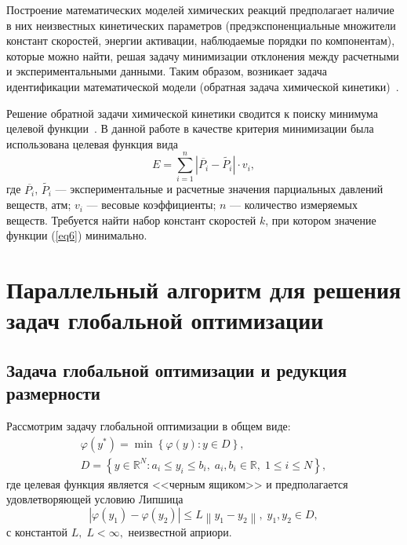 \documentclass{cmi}
\begin{document}
Построение математических моделей химических реакций предполагает наличие в них неизвестных кинетических параметров (предэкспоненциальные множители констант скоростей, энергии активации, наблюдаемые порядки по компонентам), которые можно найти, решая задачу минимизации отклонения между расчетными и экспериментальными данными. Таким образом, возникает задача идентификации математической модели (обратная задача химической кинетики)~.

Решение обратной задачи химической кинетики сводится к поиску минимума целевой функции~. В данной работе в качестве критерия минимизации была использована целевая функция вида
\begin{equation}\label{eq6}
E=\sum_{i=1}^n \left|\overline{P_{i}}-\widetilde{P_{i}}\right|\cdot v_{i},
\end{equation}
где $\overline{P_{i}}$, $\widetilde{P_{i}}$ --- экспериментальные и расчетные значения парциальных давлений веществ, атм; $v_{i}$ --- весовые коэффициенты; $n$ --- количество измеряемых веществ.
Требуется найти набор констант скоростей $k$, при котором значение функции (\ref{eq6}) минимально.

\section{Параллельный алгоритм для решения задач глобальной оптимизации} \label{sec-PGSA}
\subsection{Задача глобальной оптимизации и редукция размерности}

Рассмотрим задачу глобальной оптимизации в общем виде:
\begin{gather}
 \varphi(y^\ast)=\min{\left\{\varphi(y):y\in D\right\}}, \label{problem}\\
 D=\left\{y\in \mathbb{R}^N: a_i\leqslant y_i \leqslant b_i, \; a_i,b_i\in \mathbb{R}, \;  1\leqslant i \leqslant N\right\} \label{D},
\end{gather}
где целевая функция является <<черным ящиком>> и предполагается удовлетворяющей условию Липшица
\[
\left|\varphi(y_1)-\varphi(y_2)\right|\leqslant L\left\|y_1-y_2\right\|,\; y_1,y_2 \in D,
\]
с константой $L, \; L<\infty,$ неизвестной априори.
\end{document}
